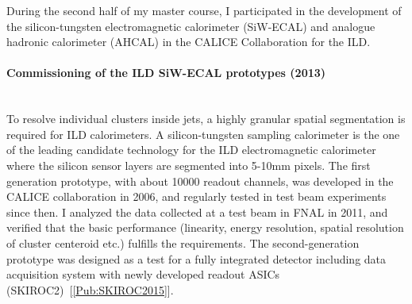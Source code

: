 \documentclass[12pt]{article}
\newcommand{\Subsubsection}[1]{\subsubsection*{#1}
\addcontentsline{toc}{subsubsection}{#1}}
\begin{document}
During the second half of my master course, I participated in the development of the silicon-tungsten electromagnetic calorimeter (SiW-ECAL) and analogue hadronic calorimeter (AHCAL) in the CALICE Collaboration for the ILD. \\

\paragraph{Commissioning of the ILD SiW-ECAL prototypes (2013)}  \phantom{k} \vspace{3mm} \\
To resolve individual clusters inside jets, a highly granular spatial segmentation is required for ILD calorimeters. 
A silicon-tungsten sampling calorimeter is the one of the leading candidate technology for the ILD electromagnetic calorimeter where the silicon sensor layers are segmented into 5-10mm pixels. 
The first generation prototype, with about 10000 readout channels, was developed in the CALICE collaboration in 2006, and regularly tested in test beam experiments since then. 
I analyzed the data collected at a test beam in FNAL in 2011, and verified that the basic performance (linearity, energy resolution, spatial resolution of cluster centeroid etc.) fulfills the requirements. 
The second-generation prototype was designed as a test for a fully integrated detector including data acquisition system with newly developed readout ASICs (SKIROC2)~[\ref{Pub:SKIROC2015}]. 

\end{document}
